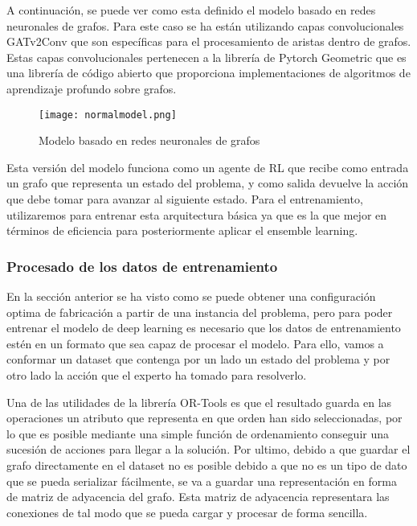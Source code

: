 A continuación, se puede ver como esta definido el modelo basado en redes neuronales de grafos.
Para este caso se ha están utilizando capas convolucionales GATv2Conv que son específicas para
el procesamiento de aristas dentro de grafos. Estas capas convolucionales pertenecen a la librería
de Pytorch Geometric \cite{pytorch-geometric} que es una librería de código abierto que proporciona
implementaciones de algoritmos de aprendizaje profundo sobre grafos. 

\begin{figure}[ht]
    \centering
    \texttt{[image: normalmodel.png]}
    \caption{Modelo basado en redes neuronales de grafos}
    \label{fig:basicmodel}
\end{figure}

Esta versión del modelo funciona como un agente de RL que recibe como entrada un grafo que representa
un estado del problema, y como salida devuelve la acción que debe tomar para avanzar al siguiente estado.
Para el entrenamiento, utilizaremos para entrenar esta arquitectura básica ya que es la que mejor
en términos de eficiencia para posteriormente aplicar el ensemble learning.

\subsubsection{Procesado de los datos de entrenamiento}
En la sección anterior se ha visto como se puede obtener una configuración optima de fabricación
a partir de una instancia del problema, pero para poder entrenar el modelo de deep learning es necesario
que los datos de entrenamiento estén en un formato que sea capaz de procesar el modelo. Para ello,
vamos a conformar un dataset que contenga por un lado un estado del problema y por otro lado la
acción que el experto ha tomado para resolverlo.\medskip

Una de las utilidades de la librería OR-Tools es que el resultado guarda en las operaciones
un atributo que representa en que orden han sido seleccionadas, por lo que es posible mediante 
una simple función de ordenamiento conseguir una sucesión de acciones para llegar a la solución.
Por ultimo, debido a que guardar el grafo directamente en el dataset no es posible debido a que
no es un tipo de dato que se pueda serializar fácilmente, se va a guardar una representación en forma de
matriz de adyacencia del grafo. Esta matriz de adyacencia representara las conexiones de tal modo que 
se pueda cargar y procesar de forma sencilla.

